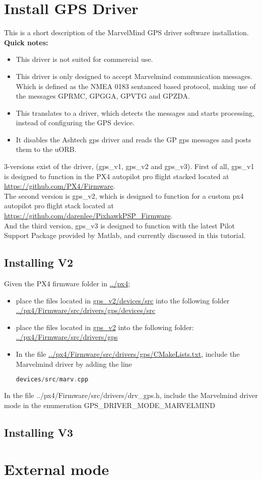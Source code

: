 \section{Install GPS Driver}
This is a short description of the MarvelMind GPS driver software installation.\\
\newline
\textbf{Quick notes:}
\begin{itemize}
	\item This driver is not suited for commercial use.
	\item This driver is only designed to accept Marvelmind communication messages. Which is defined as the NMEA 0183 sentanced based protocol, making use of the messages GPRMC, GPGGA, GPVTG and GPZDA.
	\item This translates to a driver, which detects the messages and starts processing, instead of configuring the GPS device.
	\item It disables the Ashtech gps driver and reads the GP gps messages and posts them to the uORB.
\end{itemize}
3-versions exist of the driver, (gps\_v1, gps\_v2 and gps\_v3). First of all, gps\_v1 is designed to function in the PX4 autopilot pro flight stacked located at \url{https://github.com/PX4/Firmware}.\\ 
\newline
The second version is gps\_v2, which is designed to function for a custom px4 autopilot pro flight stack located at \url{https://github.com/darenlee/PixhawkPSP\_Firmware}.\\
\newline
And the third version, gps\_v3 is designed to function with the latest Pilot Support Package provided by Matlab, and currently discussed in this tutorial.
\subsection{Installing V2}
Given the PX4 firmware folder in \url{../px4};
\begin{itemize}
	\item place the files located in \url{gps\_v2/devices/src} into the following folder \url{../px4/Firmware/src/drivers/gps/devices/src}
	\item place the files located in \url{gps\_v2} into the following folder: \url{../px4/Firmware/src/drivers/gps}
	\item In the file \url{../px4/Firmware/src/drivers/gps/CMakeLists.txt}, include the Marvelmind driver by adding the line \begin{lstlisting}[language=c++]
	devices/src/marv.cpp
	\end{lstlisting}
\end{itemize}



In the file ../px4/Firmware/src/drivers/drv\_gps.h, include the Marvelmind driver mode in the enumeration
GPS\_DRIVER\_MODE\_MARVELMIND
\subsection{Installing V3}
\section{External mode}
